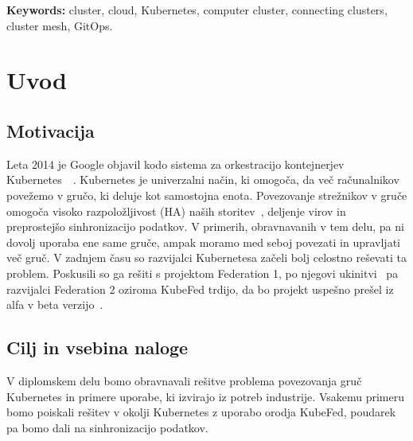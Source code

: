 \documentclass[a4paper, 12pt]{book}
\newcommand{\tkeywordsEn}{cluster, cloud, Kubernetes, computer cluster, connecting clusters, cluster mesh, GitOps}
\newcommand{\clearemptydoublepage}{\newpage{\pagestyle{empty}\cleardoublepage}}
\begin{document}
\bigskip
\noindent\textbf{Keywords:} \tkeywordsEn.
\clearemptydoublepage
\mainmatter
\setcounter{page}{1}
\pagestyle{fancy}
\chapter{Uvod}
\label{uvod}
\section{Motivacija}
Leta 2014 je Google objavil kodo sistema za orkestracijo kontejnerjev Kubernetes~\cite{what-is-Kubernetes}~\cite{borg-omega-kubernetes}.
Kubernetes  je univerzalni način, ki omogoča, da več računalnikov povežemo v gručo, ki deluje kot samostojna enota. 
Povezovanje strežnikov v gruče omogoča visoko razpoložljivost (HA) naših storitev~\cite{mastering-kubernetes}, deljenje virov in preprostejšo sinhronizacijo podatkov.
V primerih, obravnavanih v tem delu, pa ni dovolj uporaba ene same gruče, ampak moramo med seboj povezati in upravljati več gruč.
V zadnjem času so razvijalci Kubernetesa začeli bolj celostno reševati ta problem.
Poskusili so ga rešiti s projektom Federation 1, po njegovi ukinitvi~\cite{kubernetes-federation-evolution} pa razvijalci Federation 2 oziroma KubeFed trdijo, da bo projekt uspešno prešel iz alfa v beta verzijo~\cite{kubefed-repo}.
\section{Cilj in vsebina naloge}
V diplomskem delu bomo obravnavali rešitve problema povezovanja gruč Kubernetes in primere uporabe, ki izvirajo iz potreb industrije.
Vsakemu primeru bomo poiskali rešitev v okolji Kubernetes z uporabo orodja KubeFed, poudarek pa bomo dali na sinhronizacijo podatkov.
\end{document}
